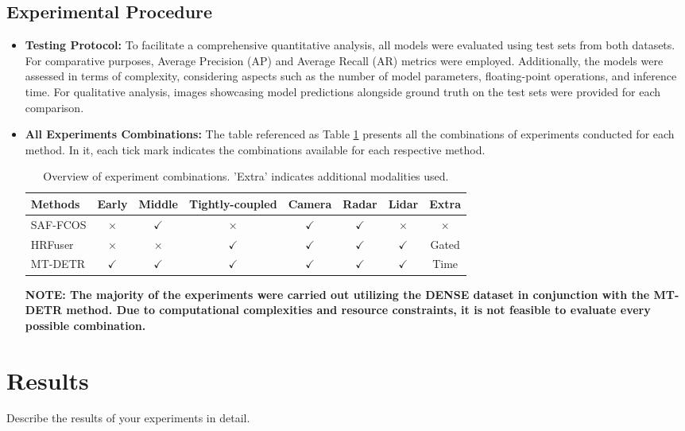 \documentclass[report.tex]{subfiles}
\begin{document}
        

        
        \subsection{Experimental Procedure}
        \begin{itemize}
            \item \textbf{Testing Protocol:} To facilitate a comprehensive quantitative analysis, all models were evaluated using test sets from both datasets. For comparative purposes, Average Precision (AP) and Average Recall (AR) metrics were employed. Additionally, the models were assessed in terms of complexity, considering aspects such as the number of model parameters, floating-point operations, and inference time. For qualitative analysis, images showcasing model predictions alongside ground truth on the test sets were provided for each comparison.
            \item \textbf{All Experiments Combinations:} The table referenced as Table \ref{tab:experiment_combinations} presents all the combinations of experiments conducted for each method. In it, each tick mark indicates the combinations available for each respective method. 

            \begin{table}[h!]
                \centering
                \caption{Overview of experiment combinations. 'Extra' indicates additional modalities used.}
                \begin{tabular}{|l|c|c|c|c|c|c|c|}
                \hline
                \textbf{Methods} & \textbf{Early} & \textbf{Middle} & \textbf{Tightly-coupled} & \textbf{Camera} & \textbf{Radar} & \textbf{Lidar} & \textbf{Extra} \\ \hline
                SAF-FCOS & $\times$ & $\checkmark$ & $\times$ & $\checkmark$ & $\checkmark$ & $\times$ & $\times$ \\ \hline
                HRFuser & $\times$ & $\times$ & $\checkmark$ & $\checkmark$ & $\checkmark$ & $\checkmark$ & Gated \\ \hline
                MT-DETR & $\checkmark$ & $\checkmark$ & $\checkmark$ & $\checkmark$ & $\checkmark$ & $\checkmark$ & Time \\ \hline
                \end{tabular}
                \label{tab:experiment_combinations}
                \end{table}

            
            \textbf{NOTE: The majority of the experiments were carried out utilizing the DENSE dataset in conjunction with the MT-DETR method. Due to computational complexities and resource constraints, it is not feasible to evaluate every possible combination.}
                
        \end{itemize}
        




    \section{Results}

    Describe the results of your experiments in detail.
\end{document}
